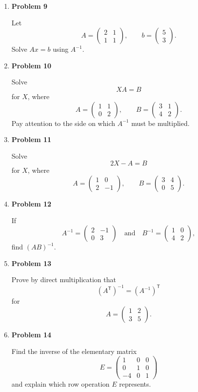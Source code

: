 \begin{enumerate}
\item \textbf{Problem 9}\par
Let
\[
A=\begin{pmatrix}2&1\\1&1\end{pmatrix},
\qquad
b=\begin{pmatrix}5\\3\end{pmatrix}.
\]
Solve \(Ax=b\) using \(A^{-1}\).

\item \textbf{Problem 10}\par
Solve
\[
XA=B
\]
for \(X\), where
\[
A=\begin{pmatrix}1&1\\0&2\end{pmatrix},
\qquad
B=\begin{pmatrix}3&1\\4&2\end{pmatrix}.
\]
Pay attention to the side on which \(A^{-1}\) must be multiplied.

\item \textbf{Problem 11}\par
Solve
\[
2X-A=B
\]
for \(X\), where
\[
A=\begin{pmatrix}1&0\\2&-1\end{pmatrix},
\qquad
B=\begin{pmatrix}3&4\\0&5\end{pmatrix}.
\]

\item \textbf{Problem 12}\par
If
\[
A^{-1}=\begin{pmatrix}2&-1\\0&3\end{pmatrix}
\quad\text{and}\quad
B^{-1}=\begin{pmatrix}1&0\\4&2\end{pmatrix},
\]
find \((AB)^{-1}\).

\item \textbf{Problem 13}\par
Prove by direct multiplication that
\[
(A^{\mathsf T})^{-1}=(A^{-1})^{\mathsf T}
\]
for
\[
A=\begin{pmatrix}1&2\\3&5\end{pmatrix}.
\]

\item \textbf{Problem 14}\par
Find the inverse of the elementary matrix
\[
E=\begin{pmatrix}
1&0&0\\
0&1&0\\
-4&0&1
\end{pmatrix}
\]
and explain which row operation \(E\) represents.


\end{enumerate}
